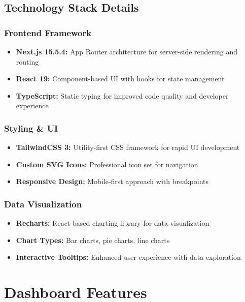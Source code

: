 \documentclass[12pt,a4paper]{article}
\begin{document}
\subsection{Technology Stack Details}

\subsubsection{Frontend Framework}
\begin{itemize}
    \item \textbf{Next.js 15.5.4:} App Router architecture for server-side rendering and routing
    \item \textbf{React 19:} Component-based UI with hooks for state management
    \item \textbf{TypeScript:} Static typing for improved code quality and developer experience
\end{itemize}

\subsubsection{Styling \& UI}
\begin{itemize}
    \item \textbf{TailwindCSS 3:} Utility-first CSS framework for rapid UI development
    \item \textbf{Custom SVG Icons:} Professional icon set for navigation
    \item \textbf{Responsive Design:} Mobile-first approach with breakpoints
\end{itemize}

\subsubsection{Data Visualization}
\begin{itemize}
    \item \textbf{Recharts:} React-based charting library for data visualization
    \item \textbf{Chart Types:} Bar charts, pie charts, line charts
    \item \textbf{Interactive Tooltips:} Enhanced user experience with data exploration
\end{itemize}

\section{Dashboard Features}
\end{document}
